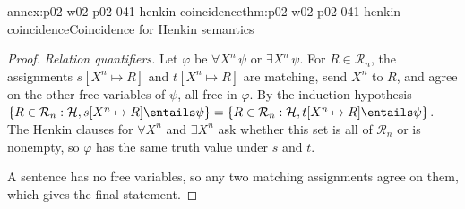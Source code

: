 \begin{annexitem}{annex:p02-w02-p02-041-henkin-coincidence}{thm:p02-w02-p02-041-henkin-coincidence}{Coincidence for Henkin semantics}
\begin{proof}
\emph{Relation quantifiers.}  Let \(\varphi\) be \(\forall X^n\,\psi\) or
\(\exists X^n\,\psi\).  For \(R\in\mathcal R_n\), the assignments
\(s[X^n\mapsto R]\) and \(t[X^n\mapsto R]\) are matching, send \(X^n\) to
\(R\), and agree on the other free variables of \(\psi\), all free in
\(\varphi\).  By the induction hypothesis
\(\{R\in\mathcal R_n:\mathcal H,s[X^n\mapsto R]\entails\psi\}=
\{R\in\mathcal R_n:\mathcal H,t[X^n\mapsto R]\entails\psi\}\).  The Henkin
clauses for \(\forall X^n\) and \(\exists X^n\) ask whether this set is all of
\(\mathcal R_n\) or is nonempty, so \(\varphi\) has the same truth value under
\(s\) and \(t\).

A sentence has no free variables, so any two matching assignments agree on
them, which gives the final statement.
\end{proof}
\end{annexitem}

